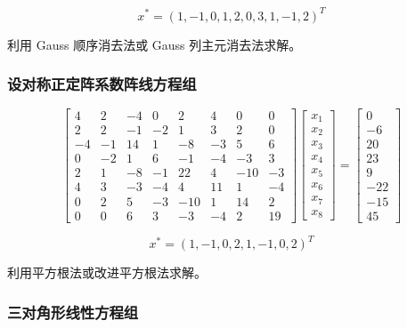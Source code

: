 \[x^* = (1, -1, 0, 1, 2, 0, 3, 1, -1, 2) ^ T\]

利用 Gauss 顺序消去法或 Gauss 列主元消去法求解。

\subsubsection{设对称正定阵系数阵线方程组}



\[
    \begin{bmatrix}
        4  & 2  & -4 & 0  & 2   & 4  & 0   & 0  \\
        2  & 2  & -1 & -2 & 1   & 3  & 2   & 0  \\
        -4 & -1 & 14 & 1  & -8  & -3 & 5   & 6  \\
        0  & -2 & 1  & 6  & -1  & -4 & -3  & 3  \\
        2  & 1  & -8 & -1 & 22  & 4  & -10 & -3 \\
        4  & 3  & -3 & -4 & 4   & 11 & 1   & -4 \\
        0  & 2  & 5  & -3 & -10 & 1  & 14  & 2  \\
        0  & 0  & 6  & 3  & -3  & -4 & 2   & 19
    \end{bmatrix}
    \begin{bmatrix}
        x_1 \\
        x_2 \\
        x_3 \\
        x_4 \\
        x_5 \\
        x_6 \\
        x_7 \\
        x_8
    \end{bmatrix}
    =
    \begin{bmatrix}
        0   \\
        -6  \\
        20  \\
        23  \\
        9   \\
        -22 \\
        -15 \\
        45
    \end{bmatrix}
\]

\[
    x^* = (1, -1, 0, 2, 1, -1, 0, 2)^T
\]

利用平方根法或改进平方根法求解。

\subsubsection{三对角形线性方程组}



